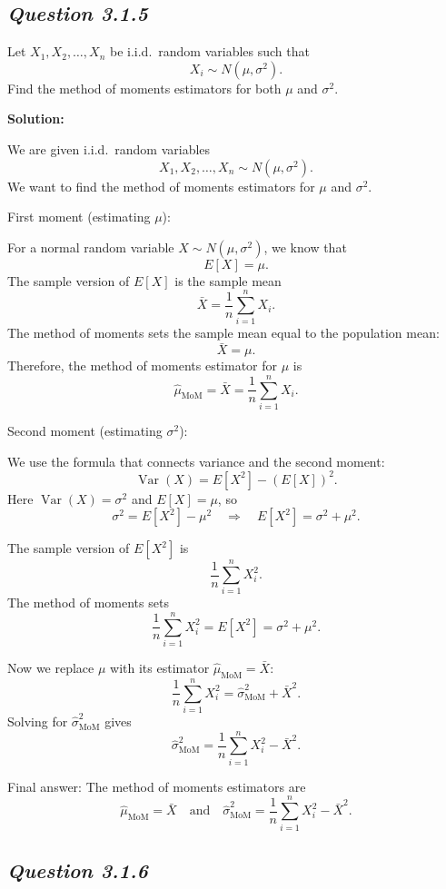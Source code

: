 \documentclass[11pt,letterpaper]{article}
\theoremstyle{remark}
\begin{document}
\subsection*{\textit{Question 3.1.5}}

Let $X_1, X_2, \dots, X_n$ be i.i.d.\ random variables such that
\[
X_i \sim N(\mu, \sigma^2).
\]
Find the method of moments estimators for both $\mu$ and $\sigma^2$.

\vspace{1cm}

\textbf{Solution:}

We are given i.i.d.\ random variables
\[
X_1, X_2, \dots, X_n \sim N(\mu, \sigma^2).
\]
We want to find the method of moments estimators for $\mu$ and $\sigma^2$.

\medskip
\noindent
First moment (estimating $\mu$):

For a normal random variable $X \sim N(\mu, \sigma^2)$, we know that
\[
E[X] = \mu.
\]
The sample version of $E[X]$ is the sample mean
\[
\bar{X} = \frac{1}{n}\sum_{i=1}^n X_i.
\]
The method of moments sets the sample mean equal to the population mean:
\[
\bar{X} = \mu.
\]
Therefore, the method of moments estimator for $\mu$ is
\[
\hat{\mu}_{\text{MoM}} = \bar{X} = \frac{1}{n}\sum_{i=1}^n X_i.
\]

\medskip
\noindent
Second moment (estimating $\sigma^2$):

We use the formula that connects variance and the second moment:
\[
\operatorname{Var}(X) = E[X^2] - (E[X])^2.
\]
Here $\operatorname{Var}(X) = \sigma^2$ and $E[X] = \mu$, so
\[
\sigma^2 = E[X^2] - \mu^2
\quad\Longrightarrow\quad
E[X^2] = \sigma^2 + \mu^2.
\]

The sample version of $E[X^2]$ is
\[
\frac{1}{n}\sum_{i=1}^n X_i^2.
\]
The method of moments sets
\[
\frac{1}{n}\sum_{i=1}^n X_i^2 = E[X^2] = \sigma^2 + \mu^2.
\]

Now we replace $\mu$ with its estimator $\hat{\mu}_{\text{MoM}} = \bar{X}$:
\[
\frac{1}{n}\sum_{i=1}^n X_i^2 = \hat{\sigma}^2_{\text{MoM}} + \bar{X}^2.
\]
Solving for $\hat{\sigma}^2_{\text{MoM}}$ gives
\[
\hat{\sigma}^2_{\text{MoM}} = \frac{1}{n}\sum_{i=1}^n X_i^2 - \bar{X}^2.
\]

\medskip
\noindent
Final answer: The method of moments estimators are
\[
\boxed{
\hat{\mu}_{\text{MoM}} = \bar{X}
\quad\text{and}\quad
\hat{\sigma}^2_{\text{MoM}} = \frac{1}{n}\sum_{i=1}^n X_i^2 - \bar{X}^2.
}
\]

\newpage

\subsection*{\textit{Question 3.1.6}}
\end{document}
